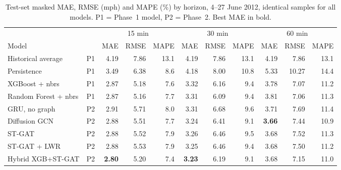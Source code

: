 \begin{table}[t]\centering
\caption{Test-set masked MAE, RMSE (mph) and MAPE (\%) by horizon, 4--27 June 2012, identical samples for all models. P1 = Phase~1 model, P2 = Phase~2. Best MAE in bold.}
\label{tab:main}\footnotesize\setlength{\tabcolsep}{4pt}
\begin{tabular}{llrrrrrrrrr}\hline
 & & \multicolumn{3}{c}{15 min} & \multicolumn{3}{c}{30 min} & \multicolumn{3}{c}{60 min}\\
Model & & MAE & RMSE & MAPE & MAE & RMSE & MAPE & MAE & RMSE & MAPE\\\hline
Historical average & P1 & 4.19 & 7.86 & 13.1 & 4.19 & 7.86 & 13.1 & 4.19 & 7.86 & 13.1\\
Persistence & P1 & 3.49 & 6.38 & 8.6 & 4.18 & 8.00 & 10.8 & 5.33 & 10.27 & 14.4\\
XGBoost + nbrs & P1 & 2.87 & 5.18 & 7.6 & 3.32 & 6.16 & 9.4 & 3.78 & 7.07 & 11.2\\
Random Forest + nbrs & P1 & 2.87 & 5.16 & 7.7 & 3.31 & 6.09 & 9.4 & 3.81 & 7.06 & 11.3\\
\hline
GRU, no graph & P2 & 2.91 & 5.71 & 8.0 & 3.31 & 6.68 & 9.6 & 3.71 & 7.69 & 11.4\\
Diffusion GCN & P2 & 2.88 & 5.51 & 7.7 & 3.24 & 6.41 & 9.1 & \textbf{3.66} & 7.44 & 10.9\\
ST-GAT & P2 & 2.88 & 5.52 & 7.9 & 3.26 & 6.46 & 9.5 & 3.68 & 7.52 & 11.3\\
ST-GAT + LWR & P2 & 2.88 & 5.53 & 7.9 & 3.25 & 6.46 & 9.4 & 3.68 & 7.50 & 11.2\\
Hybrid XGB+ST-GAT & P2 & \textbf{2.80} & 5.20 & 7.4 & \textbf{3.23} & 6.19 & 9.1 & 3.68 & 7.15 & 11.0\\
\hline\end{tabular}\end{table}
